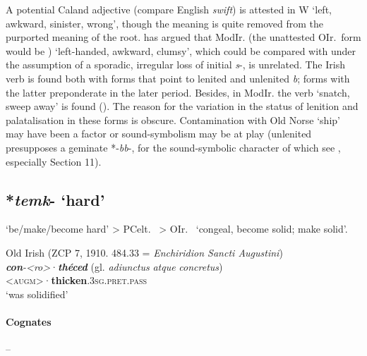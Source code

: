 \documentclass[output=paper,colorlinks,citecolor=brown]{langscibook}
\begin{document}
A potential Caland  adjective  (compare English \textit{swift}) is attested in W  ‘left, awkward, sinister, wrong’, though the meaning is quite removed from the purported meaning of the root. \citet{Schrijver2003} has argued that ModIr.  (the unattested OIr.\ form would be ) ‘left-handed, awkward, clumsy’, which could be compared with  under the assumption of a sporadic, irregular loss of initial \textit{s}-, is unrelated. The Irish verb is found both with forms that point to lenited and unlenited \textit{b}; forms with the latter preponderate in the later period. Besides, in ModIr. the verb  ‘snatch, sweep away’ is found (). The reason for the variation in the status of lenition and palatalisation in these forms is obscure. Contamination with Old Norse  ‘ship’ may have been a factor or sound-symbolism may be at play (unlenited  presupposes a geminate *-\textit{bb}-, for the sound-symbolic character of which see \citealt{Stifter2024}, especially Section 11).


\subsection{*\textit{temk}- ‘hard’}
\label{sec:stativehard}
 ‘be/make/become hard’ > PCelt.\  > OIr.\   ‘congeal, become solid; make solid’.


\begin{exe}
    \ex Old Irish (ZCP 7, 1910. 484.33 = \textit{Enchiridion Sancti Augustini})\label{ex:stativehard}\\
        \gll \textit{\textbf{con}-<ro>}·\textit{\textbf{théced}}  (gl. \textit{adiunctus} \textit{atque} \textit{concretus})  \\
    <\textsc{augm}>·\textbf{thicken}.\textsc{3sg.}\textsc{pret.pass}\\
        \glt ‘was solidified’\\
\end{exe}


\paragraph*{Cognates}  -- 
\end{document}
